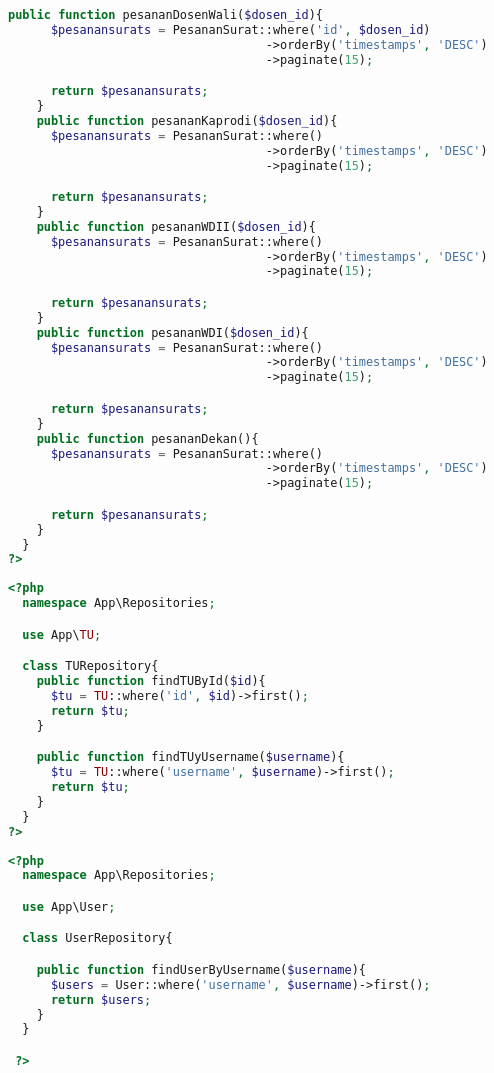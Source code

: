 \begin{lstlisting}[language=php, caption=PesanansuratRepository.php]
    public function pesananDosenWali($dosen_id){
      $pesanansurats = PesananSurat::where('id', $dosen_id)
                                    ->orderBy('timestamps', 'DESC')
                                    ->paginate(15);

      return $pesanansurats;
    }
    public function pesananKaprodi($dosen_id){
      $pesanansurats = PesananSurat::where()
                                    ->orderBy('timestamps', 'DESC')
                                    ->paginate(15);

      return $pesanansurats;
    }
    public function pesananWDII($dosen_id){
      $pesanansurats = PesananSurat::where()
                                    ->orderBy('timestamps', 'DESC')
                                    ->paginate(15);

      return $pesanansurats;
    }
    public function pesananWDI($dosen_id){
      $pesanansurats = PesananSurat::where()
                                    ->orderBy('timestamps', 'DESC')
                                    ->paginate(15);

      return $pesanansurats;
    }
    public function pesananDekan(){
      $pesanansurats = PesananSurat::where()
                                    ->orderBy('timestamps', 'DESC')
                                    ->paginate(15);

      return $pesanansurats;
    }
  }
?>

\end{lstlisting}

\begin{lstlisting}[language=php, caption=TURepository.php]
	<?php
  namespace App\Repositories;

  use App\TU;

  class TURepository{
    public function findTUById($id){
      $tu = TU::where('id', $id)->first();
      return $tu;
    }

    public function findTUyUsername($username){
      $tu = TU::where('username', $username)->first();
      return $tu;
    }
  }
?>

\end{lstlisting}

\begin{lstlisting}[language=php, caption=UserRepository.php]
	<?php
  namespace App\Repositories;

  use App\User;

  class UserRepository{

    public function findUserByUsername($username){
      $users = User::where('username', $username)->first();
      return $users;
    }
  }

 ?>

\end{lstlisting}